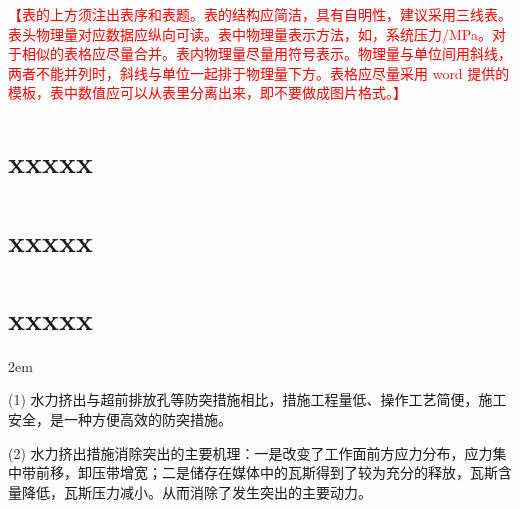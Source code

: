 \noindent
\begin{table}[H]
    \centering
    \caption{纯细水雾和含复合添加剂细水雾灭火时间}
    \label{tab:2.1}
\end{table}

\textcolor{red}{【表的上方须注出表序和表题。表的结构应简洁，具有自明性，建议采用三线表。表头物理量对应数据应纵向可读。表中物理量表示方法，如，系统压力/MPa。对于相似的表格应尽量合并。表内物理量尽量用符号表示。物理量与单位间用斜线，两者不能并列时，斜线与单位一起排于物理量下方。表格应尽量采用 word 提供的模板，表中数值应可以从表里分离出来，即不要做成图片格式。】}

\endgroup
\clearpage
\section{xxxxx}

\clearpage
\section{xxxxx}

\clearpage
\section{xxxxx}
\begingroup
{}\songti
\setlength{\baselineskip}{25pt}
\parindent 2em

(1) 水力挤出与超前排放孔等防突措施相比，措施工程量低、操作工艺简便，施工安全，是一种方便高效的防突措施。

(2) 水力挤出措施消除突出的主要机理：一是改变了工作面前方应力分布，应力集中带前移，卸压带增宽；二是储存在媒体中的瓦斯得到了较为充分的释放，瓦斯含量降低，瓦斯压力减小。从而消除了发生突出的主要动力。
\par
\endgroup

